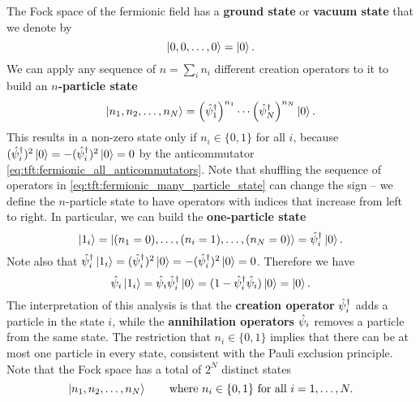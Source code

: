 The Fock space of the fermionic field has a \textbf{ground state} or \textbf{vacuum state} that we denote by
\begin{equation}
	\ket{0, 0, \ldots, 0} = \ket{0}. \\
\end{equation}
We can apply any sequence of $n = \sum_i n_i$ different creation operators to it to build an \textbf{$n$-particle state}
\begin{equation}
	\ket{n_1, n_2, \ldots, n_N} = \left( \hat\psi^\dagger_1 \right)^{n_1} \cdots \left( \hat\psi^\dagger_N \right)^{n_N} \ket{0} .
\label{eq:tft:fermionic_many_particle_state}
\end{equation}
This results in a non-zero state only if $n_i \in \{0, 1\}$ for all $i$, because $(\hat\psi^\dagger_i)^2 \ket{0} = -(\hat\psi^\dagger_i)^2 \ket{0} = 0$ by the anticommutator \eqref{eq:tft:fermionic_all_anticommutators}.
Note that shuffling the sequence of operators in \cref{eq:tft:fermionic_many_particle_state} can change the sign -- we define the $n$-particle state to have operators with indices that increase from left to right.
In particular, we can build the \textbf{one-particle state}
\begin{equation}
	\ket{1_i} = \ket{(n_1=0), \ldots, (n_i=1), \ldots, (n_N=0)} = \hat\psi^\dagger_i \ket{0} .
\end{equation}
Note also that $\hat\psi^\dagger_i \ket{1_i} = (\hat\psi^\dagger_i)^2 \ket{0} = -(\hat\psi^\dagger_i)^2 \ket{0} = 0$.
Therefore we have
\begin{equation}
	\hat\psi_i \ket{1_i} = \hat\psi_i \hat\psi^\dagger_i \ket{0} = (1 - \hat\psi^\dagger_i \hat\psi_i) \ket{0} = \ket{0} .
\end{equation}
The interpretation of this analysis is that the \textbf{creation operator} $\hat\psi^\dagger_i$ adds a particle in the state $i$, while the \textbf{annihilation operators} $\hat\psi_i$ removes a particle from the same state.
The restriction that $n_i \in \{0, 1\}$ implies that there can be at most one particle in every state, consistent with the Pauli exclusion principle.
Note that the Fock space has a total of $2^N$ distinct states
\begin{equation}
	\ket{n_1, n_2, \ldots, n_N} \qquad \text{where } n_i \in \{0, 1\} \text{ for all } i = 1, \ldots, N .
\label{eq:tft:fermion_all_states}
\end{equation}


